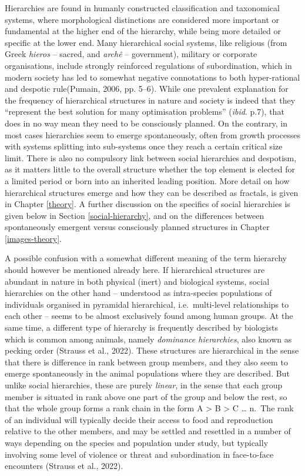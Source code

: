\documentclass[
  12pt,
]{book}
\begin{document}
Hierarchies are found in humanly constructed classification and taxonomical systems, where morphological distinctions are considered more important or fundamental at the higher end of the hierarchy, while being more detailed or specific at the lower end. Many hierarchical social systems, like religious (from Greek \emph{hieros} -- sacred, and \emph{archê} -- government), military or corporate organisations, include strongly reinforced regulations of subordination, which in modern society has led to somewhat negative connotations to both hyper-rational and despotic rule(Pumain, 2006, pp. 5--6). While one prevalent explanation for the frequency of hierarchical structures in nature and society is indeed that they ``represent the best solution for many optimisation problems'' (\emph{ibid}. p.7), that does in no way mean they need to be consciously planned. On the contrary, in most cases hierarchies seem to emerge spontaneously, often from growth processes with systems splitting into sub-systems once they reach a certain critical size limit. There is also no compulsory link between social hierarchies and despotism, as it matters little to the overall structure whether the top element is elected for a limited period or born into an inherited leading position. More detail on how hierarchical structures emerge and how they can be described as fractals, is given in Chapter \ref{theory}. A further discussion on the specifics of social hierarchies is given below in Section \ref{social-hierarchy}, and on the differences between spontaneously emergent versus consciously planned structures in Chapter \ref{images-theory}.

A possible confusion with a somewhat different meaning of the term hierarchy should however be mentioned already here. If hierarchical structures are abundant in nature in both physical (inert) and biological systems, social hierarchies on the other hand -- understood as intra-species populations of individuals organised in pyramidal hierarchical, i.e.~multi-level relationships to each other -- seems to be almost exclusively found among human groups. At the same time, a different type of hierarchy is frequently described by biologists which is common among animals, namely \emph{dominance hierarchies}, also known as pecking order (Strauss et al., 2022). These structures are hierarchical in the sense that there is difference in rank between group members, and they also seem to emerge spontaneously in the animal populations where they are described. But unlike social hierarchies, these are purely \emph{linear}, in the sense that each group member is situated in rank above one part of the group and below the rest, so that the whole group forms a rank chain in the form A \textgreater{} B \textgreater{} C \ldots{} n.~The rank of an individual will typically decide their access to food and reproduction relative to the other members, and may be settled and resettled in a number of ways depending on the species and population under study, but typically involving some level of violence or threat and subordination in face-to-face encounters (Strauss et al., 2022).
\end{document}

